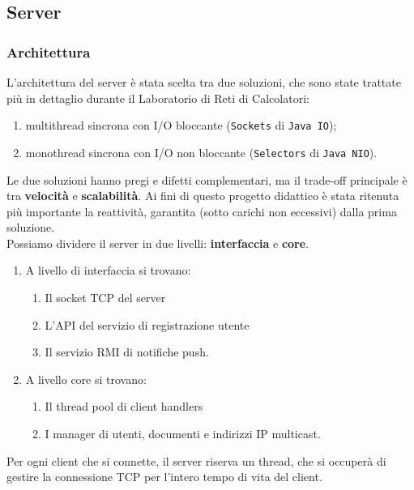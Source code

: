 \subsection{Server}

\subsubsection{Architettura}
L'architettura del server è stata scelta tra due soluzioni, che sono state trattate più in dettaglio durante il Laboratorio di Reti di Calcolatori:

\begin{enumerate}
	\item multithread sincrona con I/O bloccante (\texttt{Sockets} di \texttt{Java IO});
	\item monothread sincrona con I/O non bloccante (\texttt{Selectors} di \texttt{Java NIO}).
\end{enumerate}

Le due soluzioni hanno pregi e difetti complementari, ma il trade-off principale è tra \textbf{velocità} e \textbf{scalabilità}. Ai fini di questo progetto didattico è stata ritenuta più importante la reattività, garantita (sotto carichi non eccessivi) dalla prima soluzione.
\medskip \\
Possiamo dividere il server in due livelli: \textbf{interfaccia} e \textbf{core}.

\begin{enumerate}
	\item A livello di interfaccia si trovano:
		\begin{enumerate}
			\item Il socket TCP del server
			\item L'API del servizio di registrazione utente
			\item Il servizio RMI di notifiche push.
		\end{enumerate}
	\item A livello core si trovano:
		\begin{enumerate}
			\item Il thread pool di client handlers
			\item I manager di utenti, documenti e indirizzi IP multicast.
		\end{enumerate}
\end{enumerate}

Per ogni client che si connette, il server riserva un thread, che si occuperà di gestire la connessione TCP per l'intero tempo di vita del client.

